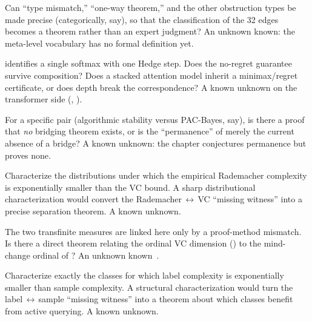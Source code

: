 \begin{openprob}
\label{op:formalize-taxonomy}
Can ``type mismatch,'' ``one-way theorem,'' and the other obstruction
types be made precise (categorically, say), so that the classification of
the 32 edges becomes a theorem rather than an expert judgment?  An unknown
known: the meta-level vocabulary has no formal definition yet.
\end{openprob}

\begin{openprob}
\label{op:attention-hedge}
 identifies a single softmax with one Hedge step.
Does the no-regret guarantee survive composition? Does a stacked
attention model inherit a minimax/regret certificate, or does depth break
the correspondence?  A known unknown on the transformer side
(, ).
\end{openprob}

\begin{openprob}
\label{op:type-mismatch-impossibility}
For a specific pair (algorithmic stability versus PAC-Bayes, say), is
there a proof that \emph{no} bridging theorem exists, or is the
``permanence'' of  merely the current absence of a
bridge?  A known unknown: the chapter conjectures permanence but proves
none.
\end{openprob}

\begin{openprob}
\label{op:rademacher-vc-dist}
Characterize the distributions under which the empirical Rademacher
complexity is exponentially smaller than the VC bound.  A sharp
distributional characterization would convert the
Rademacher$\,\leftrightarrow\,$VC ``missing witness'' into a precise
separation theorem.  A known unknown.
\end{openprob}

\begin{openprob}
\label{op:ordinal-vc-mindchange}
The two transfinite measures are linked here only by a proof-method
mismatch.  Is there a direct theorem relating the ordinal VC dimension
() to the mind-change ordinal of
?  An unknown known~\cite{MartinSharmaStephan2006}.
\end{openprob}

\begin{openprob}
\label{op:active-passive}
Characterize exactly the classes for which label complexity is
exponentially smaller than sample complexity.  A structural
characterization would turn the label$\,\leftrightarrow\,$sample
``missing witness'' into a theorem about which classes benefit from active
querying.  A known unknown.
\end{openprob}

